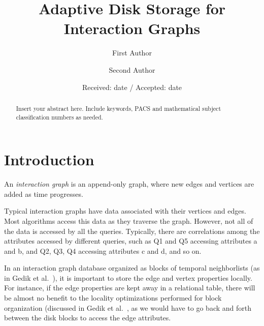 \documentclass[twocolumn]{svjour3}          %
\begin{document}
\title{Adaptive Disk Storage for Interaction Graphs}


\author{First Author         \and
        Second Author %
}



\date{Received: date / Accepted: date}


\maketitle

\begin{abstract}
Insert your abstract here. Include keywords, PACS and mathematical
subject classification numbers as needed.
\end{abstract}



\section{Introduction}
An \emph{interaction graph} is an append-only graph, where new edges and
vertices are added as time progresses. 
%

% 
Typical interaction graphs have data associated with their vertices and edges.
Most algorithms access this data as they traverse the graph. However, not all
of the data is accessed by all the queries. Typically, there are correlations
among the attributes accessed by different queries, such as Q1 and Q5
accessing attributes a and b, and Q2, Q3, Q4 accessing attributes c and d, and
so on.
%

In an interaction graph database organized as blocks of temporal neighborlists
(as in Gedik et al.~\cite{gedik14}), it is important to store the edge and vertex
properties locally. For  instance, if the edge properties are kept away in a
relational table, there will be almost no benefit to the locality
optimizations performed for block organization (discussed in Gedik et al.~\cite{gedik14}, as we would have to go back and forth between the disk blocks to
access the edge attributes. 
%
\end{document}
